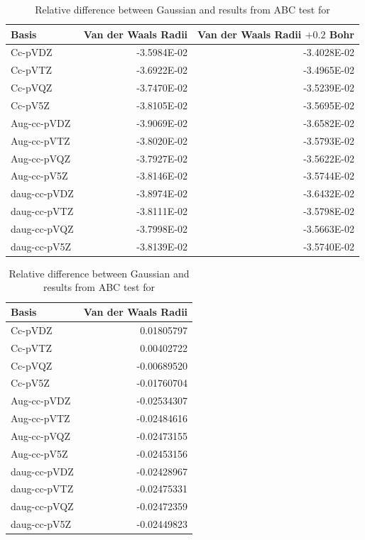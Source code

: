 \documentclass[../master_thesis.tex]{subfiles}
\begin{document}
\begin{table}[htbp]
\caption{Relative difference between Gaussian and \mrchem results from \ac{ABC}  test for }
\begin{tabular}{|l|r|r|}
\hline
Basis & \multicolumn{1}{l|}{Van der Waals Radii} & \multicolumn{1}{l|}{Van der Waals Radii $+ 0.2$ Bohr} \\ \hline
Cc-pVDZ & -3.5984E-02 & -3.4028E-02 \\ \hline
Cc-pVTZ & -3.6922E-02 & -3.4965E-02 \\ \hline
Cc-pVQZ & -3.7470E-02 & -3.5239E-02 \\ \hline
Cc-pV5Z & -3.8105E-02 & -3.5695E-02 \\ \hline
Aug-cc-pVDZ & -3.9069E-02 & -3.6582E-02 \\ \hline
Aug-cc-pVTZ & -3.8020E-02 & -3.5793E-02 \\ \hline
Aug-cc-pVQZ & -3.7927E-02 & -3.5622E-02 \\ \hline
Aug-cc-pV5Z & -3.8146E-02 & -3.5744E-02 \\ \hline
daug-cc-pVDZ & -3.8974E-02 & -3.6432E-02 \\ \hline
daug-cc-pVTZ & -3.8111E-02 & -3.5798E-02 \\ \hline
daug-cc-pVQZ & -3.7998E-02 & -3.5663E-02 \\ \hline
daug-cc-pV5Z & -3.8139E-02 & -3.5740E-02 \\ \hline
\end{tabular}
\label{tab:nopabcreldiff}
\end{table}

\begin{table}[htbp]
\caption{Relative difference between Gaussian and \mrchem results from \ac{ABC}  test for }
\begin{tabular}{|l|r|}
\hline
Basis & \multicolumn{1}{l|}{Van der Waals Radii} \\ \hline
Cc-pVDZ & 0.01805797 \\ \hline
Cc-pVTZ & 0.00402722 \\ \hline
Cc-pVQZ & -0.00689520 \\ \hline
Cc-pV5Z & -0.01760704 \\ \hline
Aug-cc-pVDZ & -0.02534307 \\ \hline
Aug-cc-pVTZ & -0.02484616 \\ \hline
Aug-cc-pVQZ & -0.02473155 \\ \hline
Aug-cc-pV5Z & -0.02453156 \\ \hline
daug-cc-pVDZ & -0.02428967 \\ \hline
daug-cc-pVTZ & -0.02475331 \\ \hline
daug-cc-pVQZ & -0.02472359 \\ \hline
daug-cc-pV5Z & -0.02449823 \\ \hline
\end{tabular}
\label{tab:cyanabcreldiff}
\end{table}
\end{document}
